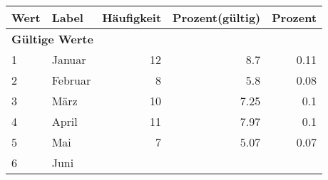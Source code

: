      \begin{longtable}{lXrrr}
     \toprule
     \textbf{Wert} & \textbf{Label} & \textbf{Häufigkeit} & \textbf{Prozent(gültig)} & \textbf{Prozent} \\
     \endhead
     \midrule
     \multicolumn{5}{l}{\textbf{Gültige Werte}}\\

     1 &
     \multicolumn{1}{X}{ Januar   } &


       \num{12} &
       \num[round-mode=places,round-precision=2]{8,7} &
         \num[round-mode=places,round-precision=2]{0,11} \\

     2 &
     \multicolumn{1}{X}{ Februar   } &


       \num{8} &
       \num[round-mode=places,round-precision=2]{5,8} &
         \num[round-mode=places,round-precision=2]{0,08} \\

     3 &
     \multicolumn{1}{X}{ März   } &


       \num{10} &
       \num[round-mode=places,round-precision=2]{7,25} &
         \num[round-mode=places,round-precision=2]{0,1} \\

     4 &
     \multicolumn{1}{X}{ April   } &


       \num{11} &
       \num[round-mode=places,round-precision=2]{7,97} &
         \num[round-mode=places,round-precision=2]{0,1} \\

     5 &
     \multicolumn{1}{X}{ Mai   } &


       \num{7} &
       \num[round-mode=places,round-precision=2]{5,07} &
         \num[round-mode=places,round-precision=2]{0,07} \\

     6 &
     \multicolumn{1}{X}{ Juni   } &



\end{longtable}
